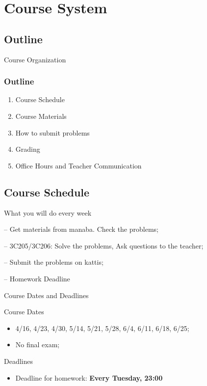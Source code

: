 
\section{Course System}
\subsection{Outline}

\begin{frame}
  \centering
  {\huge
    Course Organization
  }
\end{frame}

\begin{frame}
  \frametitle{Outline}
  \begin{enumerate}
    \item Course Schedule
    \item Course Materials
    \item How to submit problems
    \item Grading
    \item Office Hours and Teacher Communication
  \end{enumerate}
\end{frame}

\subsection{Course Schedule}
\begin{frame}{What you will do every week}
  \begin{description}
    \item[Monday] -- Get materials from \alert{manaba}. Check the problems;
    \medskip
    \item[Tuesday] -- 3C205/3C206: Solve the problems, Ask questions to the teacher;
    \medskip
    \item[Entire Week] -- Submit the problems on \alert{kattis};
    \medskip
    \item[Next Tue] -- Homework Deadline
  \end{description}
\end{frame}

\begin{frame}{Course Dates and Deadlines}
  \begin{block}{Course Dates}
    \begin{itemize}
    \item 4/16, 4/23, 4/30, 5/14, 5/21, 5/28, 6/4, 6/11, 6/18, 6/25;
    \item No final exam;
    \end{itemize}
  \end{block}
  \begin{block}{Deadlines}
    \begin{itemize}
      \item Deadline for homework: {\bf Every Tuesday, 23:00}
    \end{itemize}
  \end{block}
\end{frame}

